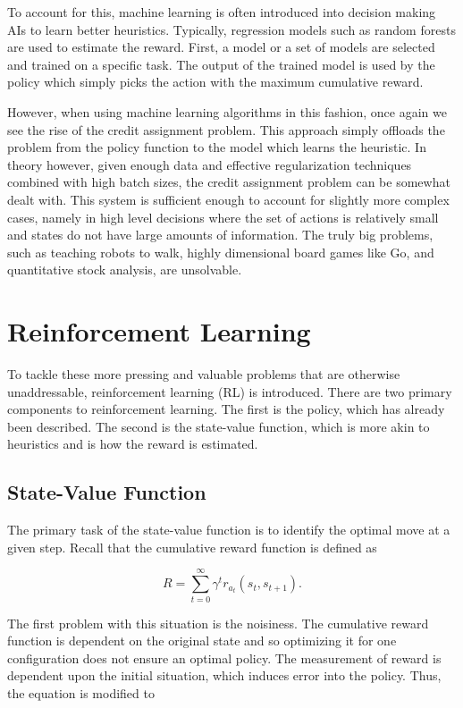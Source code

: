\documentclass{article}
\begin{document}
To account for this, machine learning is often introduced into decision making AIs to learn better heuristics. Typically, regression models such as random forests are used to estimate the reward. First, a model or a set of models are selected and trained on a specific task. The output of the trained model is used by the policy which simply picks the action with the maximum cumulative reward.
	
However, when using machine learning algorithms in this fashion, once again we see the rise of the credit assignment problem. This approach simply offloads the problem from the policy function to the model which learns the heuristic. In theory however, given enough data and effective regularization techniques combined with high batch sizes, the credit assignment problem can be somewhat dealt with. This system is sufficient enough to account for slightly more complex cases, namely in high level decisions where the set of actions is relatively small and states do not have large amounts of information. The truly big problems, such as teaching robots to walk, highly dimensional board games like Go, and quantitative stock analysis, are unsolvable.

\section{Reinforcement Learning}
To tackle these more pressing and valuable problems that are otherwise unaddressable, reinforcement learning (RL) is introduced. There are two primary components to reinforcement learning. The first is the policy, which has already been described. The second is the state-value function, which is more akin to heuristics and is how the reward is estimated.

\subsection{State-Value Function}
The primary task of the state-value function is to identify the optimal move at a given step. Recall that the cumulative reward function is defined as

$$ R = \sum_{t=0}^{\infty} \gamma^t r_{a_t}(s_t,s_{t+1}).$$

The first problem with this situation is the noisiness. The cumulative reward function is dependent on the original state and so optimizing it for one configuration does not ensure an optimal policy. The measurement of reward is dependent upon the initial situation, which induces error into the policy. Thus, the equation is modified to 
\end{document}
